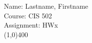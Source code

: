 \documentclass[letter,12pt]{article}
\begin{document}
Name: Lastname, Firstname \\
Course: CIS 502 \\
Assignment: HWx \\
\line(1,0){400}
\end{document}
